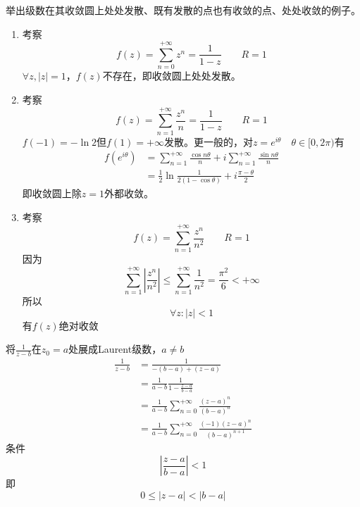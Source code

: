 \begin{homeworkProblem}
举出级数在其收敛圆上处处发散、既有发散的点也有收敛的点、处处收敛的例子。
\solution
\begin{enumerate}
    \item 考察
    \[f(z) = \sum_{n=0}^{+\infty}z^n = \frac{1}{1-z}\qquad R=1\]
    $\forall z, |z|=1$，$f(z)$不存在，即收敛圆上处处发散。
    \item 考察
    \[f(z) = \sum_{n=1}^{+\infty}\frac{z^n}{n} = \frac{1}{1-z}\qquad R=1\]
    $f(-1)=-\ln2$但$f(1)=+\infty$发散。更一般的，对$z=e^{i\theta}\quad\theta\in[0,2\pi)$有
    \[\begin{split}
    f(e^{i\theta}) &= \sum_{n=1}^{+\infty}\frac{\cos n\theta}{n}+i\sum_{n=1}^{+\infty}\frac{\sin n\theta}{n} \\
    &= \frac{1}{2}\ln\frac{1}{2(1-\cos\theta)}+i\frac{\pi-\theta}{2}
    \end{split}
    \]
    即收敛圆上除$z=1$外都收敛。
    \item 考察
    \[
    f(z) = \sum_{n=1}^{+\infty}\frac{z^n}{n^2}\qquad R=1
    \]
    因为
    \[
    \sum_{n=1}^{+\infty}\left|\frac{z^n}{n^2}\right| \leq \sum_{n=1}^{+\infty} \frac{1}{n^2} = \frac{\pi^2}{6} < +\infty
    \]
    所以
    \[\forall z:|z|<1\]有$f(z)$绝对收敛
\end{enumerate}
\end{homeworkProblem}
\begin{homeworkProblem}
    将$\frac{1}{z-b}$在$z_0=a$处展成Laurent级数，$a\neq b$\\
\solution
\[\begin{split}
\frac{1}{z-b}
&= \frac{1}{-(b-a) + (z-a)}\\
&= \frac{1}{a-b}\frac{1}{1-\frac{z-a}{b-a}} \\
&= \frac{1}{a-b}\sum_{n=0}^{+\infty}\frac{(z-a)^n}{(b-a)^n}\\
&= \frac{1}{a-b}\sum_{n=0}^{+\infty}\frac{(-1)(z-a)^n}{(b-a)^{n+1}}
\end{split}\]
条件
\[
|\frac{z-a}{b-a}| < 1
\]
即\[0\leq|z-a|<|b-a|\]
\end{homeworkProblem}
